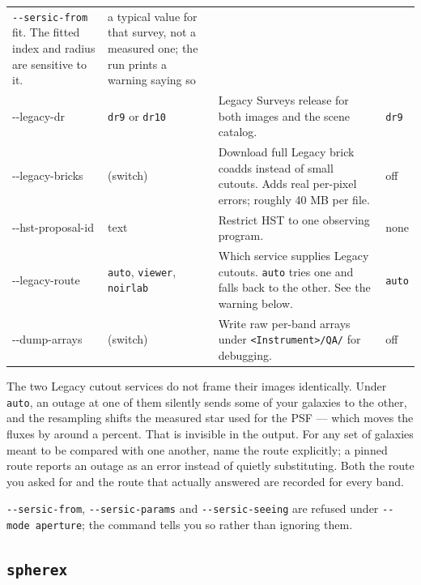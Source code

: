 \documentclass[11pt]{article}
\begin{document}
\begin{longtable}{T{2.9cm} L{2.15cm} L{6.45cm} L{2.7cm}}
  \texttt{-{}-sersic-from} fit. The fitted index and radius are sensitive
  to it. & a typical value for that survey, not a measured one; the run
  prints a warning saying so \\[2pt]
-{}-legacy-dr & \texttt{dr9} or \texttt{dr10} & Legacy Surveys release for
  both images and the scene catalog. & \texttt{dr9} \\[2pt]
-{}-legacy-\newline bricks & (switch) & Download full Legacy brick coadds instead
  of small cutouts. Adds real per-pixel errors; roughly 40 MB per file. &
  off \\[2pt]
-{}-hst-\newline proposal-id & text & Restrict HST to one observing
  program. & none \\[2pt]
-{}-legacy-route & \texttt{auto}, \texttt{viewer}, \texttt{noirlab} &
  Which service supplies Legacy cutouts. \texttt{auto} tries one and falls
  back to the other. See the warning below. & \texttt{auto} \\[2pt]
-{}-dump-arrays & (switch) & Write raw per-band arrays under
  \texttt{<Instrument>/QA/} for debugging. & off \\
\bottomrule
\end{longtable}

\begin{warnbox}
The two Legacy cutout services do not frame their images identically. Under
\texttt{auto}, an outage at one of them silently sends some of your galaxies
to the other, and the resampling shifts the measured star used for the PSF
--- which moves the fluxes by around a percent. That is invisible in the
output. For any set of galaxies meant to be compared with one another, name
the route explicitly; a pinned route reports an outage as an error instead
of quietly substituting. Both the route you asked for and the route that
actually answered are recorded for every band.
\end{warnbox}

\begin{sloppypar}
\texttt{-{}-sersic-from}, \texttt{-{}-sersic-params} and
\texttt{-{}-sersic-seeing} are refused under
\texttt{-{}-mode aperture}; the command tells you so rather than ignoring
them.
\end{sloppypar}

\subsection{\texttt{spherex}}
\end{document}
